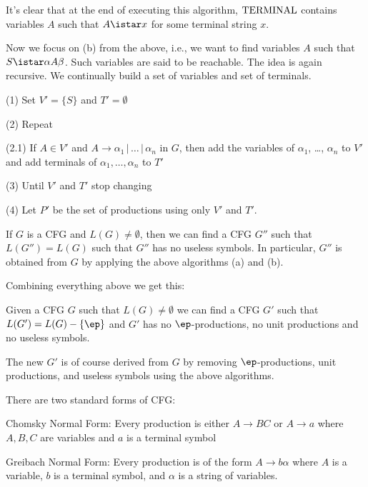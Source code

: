 It's clear that at the end of executing this algorithm, $\operatorname{TERMINAL}$
contains variables $A$ such that $A \istar x$ for some terminal
string $x$.

Now we focus on (b) from the above, i.e., we want to find
variables $A$ such that $S \istar \alpha A \beta$. Such variables
are said to be reachable. The idea is again recursive. We
continually build a set of variables and set of terminals.

\begin{mylist}
 \item[(1)] Set $V' = \{S\}$ and $T' = \emptyset$
 \item[(2)] Repeat
 \begin{mylist}
  \item[(2.1)] If $A \in V'$ and $A \rightarrow \alpha_1\,|\,
  \ldots \,|\, \alpha_n$ in $G$, then
   add the variables of
   $\alpha_1$, \ldots, $\alpha_n$ to $V'$ and add terminals of
   $\alpha_1, \ldots, \alpha_n$ to $T'$
 \end{mylist}
 \item[(3)] Until $V'$ and $T'$ stop changing
 \item[(4)] Let $P'$ be the set of productions using only $V'$
 and $T'$.
\end{mylist}

\begin{thm}
If $G$ is a CFG and $L(G) \neq \emptyset$, then we can find a CFG
$G''$ such that $L(G'') = L(G)$ such that $G''$ has no useless
symbols. In particular, $G''$ is obtained from $G$ by applying the
above algorithms (a) and (b).
\end{thm}

Combining everything above we get this:

\begin{thm}
Given a CFG $G$ such that $L(G) \neq \emptyset$ we can find a CFG
$G'$ such that $L(G') = L(G) - \{\ep\}$ and $G'$ has no
$\ep$-productions, no unit productions and no useless symbols.
\end{thm}

The new $G'$ is of course derived from $G$ by removing
$\ep$-productions, unit productions, and useless symbols using the
above algorithms.

There are two standard forms of CFG:
\begin{mylist}
 \item Chomsky Normal Form: Every production is either $A
 \rightarrow BC$ or $A \rightarrow a$ where $A,B,C$ are variables
 and $a$ is a terminal symbol
 \item Greibach Normal Form: Every production is of the form $A
 \rightarrow b\alpha$ where $A$ is a variable, $b$ is a terminal
 symbol, and $\alpha$ is a string of variables.
\end{mylist}
